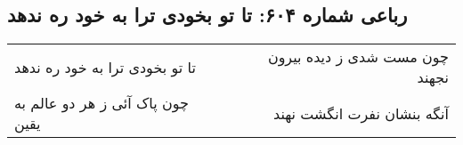 \begin{center}
\section*{رباعی شماره ۶۰۴: تا تو بخودی ترا به خود ره ندهد}
\label{sec:0604}
\begin{longtable}{l p{0.5cm} r}
تا تو بخودی ترا به خود ره ندهد
&&
چون مست شدی ز دیده بیرون نجهند
\\
چون پاک آئی ز هر دو عالم به یقین
&&
آنگه بنشان نفرت انگشت نهند
\\
\end{longtable}
\end{center}
